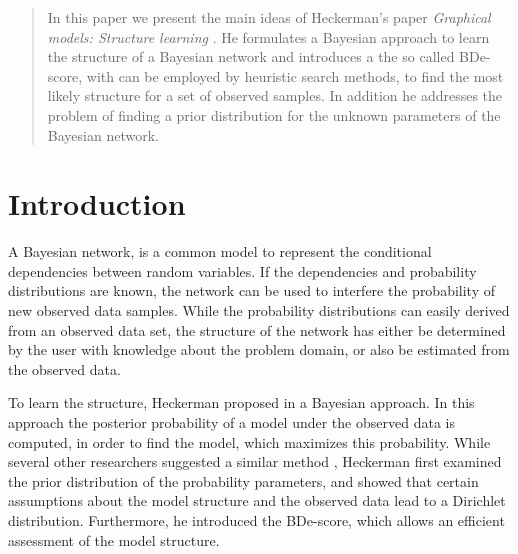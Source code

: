 \documentclass{article}
\begin{document}
 


\begin{abstract} 
	In this paper we present the main ideas of Heckerman's paper \textit{Graphical models: Structure learning}
	\cite{original}. He formulates a Bayesian approach to learn the structure of a Bayesian network and
	introduces a the so called BDe-score, with can be employed by heuristic search methods, to find
	the most likely structure for a set of observed samples. In addition he addresses the problem of
	finding a prior distribution for the unknown parameters of the Bayesian network.
\end{abstract} 


\section{Introduction}
A Bayesian network, is a common model to represent the conditional dependencies between random variables.
If the dependencies and probability distributions are known, the network can be used to interfere the
probability of new observed data samples. While the probability distributions can easily derived
from an observed data set, the structure of the network has either be determined by the user with
knowledge about the problem domain, or also be estimated from the observed data.

To learn the structure, Heckerman proposed in \cite{hcg} a Bayesian approach. In this approach the
posterior probability of a model under the observed data is computed, in order to find the model,
which maximizes this probability. While several other researchers suggested a similar method
\cite{buntine, cooper, spiegelhalter}, Heckerman first examined the prior distribution of the
probability parameters, and showed that certain assumptions about the model structure and the
observed data lead to a Dirichlet distribution. Furthermore, he introduced the BDe-score, which
allows an efficient assessment of the model structure.
\end{document}
